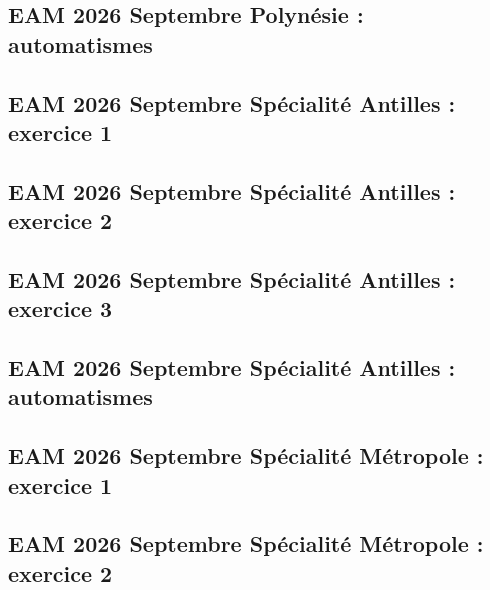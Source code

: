 \documentclass[lang=fr,edition=teacher,layout=sheet]{mxbook}
\begin{document}
\par\bigskip
{}\subsection*{EAM 2026 Septembre Polynésie : automatismes}
\begingroup\endgroup
\par\bigskip
{}\subsection*{EAM 2026 Septembre Spécialité Antilles : exercice 1}
\begingroup\endgroup
\par\bigskip
{}\subsection*{EAM 2026 Septembre Spécialité Antilles : exercice 2}
\begingroup\endgroup
\par\bigskip
{}\subsection*{EAM 2026 Septembre Spécialité Antilles : exercice 3}
\begingroup\endgroup
\par\bigskip
{}\subsection*{EAM 2026 Septembre Spécialité Antilles : automatismes}
\begingroup\endgroup
\par\bigskip
{}\subsection*{EAM 2026 Septembre Spécialité Métropole : exercice 1}
\begingroup\endgroup
\par\bigskip
{}\subsection*{EAM 2026 Septembre Spécialité Métropole : exercice 2}
\end{document}
